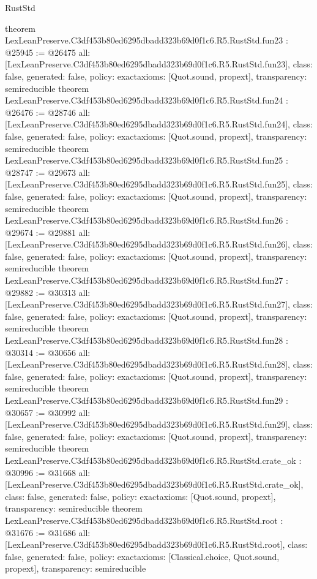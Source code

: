 \begin{lexlean}{RustStd}
\begin{coremodule}
{}
theorem LexLeanPreserve.C3df453b80ed6295dbadd323b69d0f1c6.R5.RustStd.fun23 : @25945 := @26475 {
  all: [LexLeanPreserve.C3df453b80ed6295dbadd323b69d0f1c6.R5.RustStd.fun23],
  class: false,
  generated: false,
  policy: exact{axioms: [Quot.sound, propext]},
  transparency: semireducible
}
theorem LexLeanPreserve.C3df453b80ed6295dbadd323b69d0f1c6.R5.RustStd.fun24 : @26476 := @28746 {
  all: [LexLeanPreserve.C3df453b80ed6295dbadd323b69d0f1c6.R5.RustStd.fun24],
  class: false,
  generated: false,
  policy: exact{axioms: [Quot.sound, propext]},
  transparency: semireducible
}
theorem LexLeanPreserve.C3df453b80ed6295dbadd323b69d0f1c6.R5.RustStd.fun25 : @28747 := @29673 {
  all: [LexLeanPreserve.C3df453b80ed6295dbadd323b69d0f1c6.R5.RustStd.fun25],
  class: false,
  generated: false,
  policy: exact{axioms: [Quot.sound, propext]},
  transparency: semireducible
}
theorem LexLeanPreserve.C3df453b80ed6295dbadd323b69d0f1c6.R5.RustStd.fun26 : @29674 := @29881 {
  all: [LexLeanPreserve.C3df453b80ed6295dbadd323b69d0f1c6.R5.RustStd.fun26],
  class: false,
  generated: false,
  policy: exact{axioms: [Quot.sound, propext]},
  transparency: semireducible
}
theorem LexLeanPreserve.C3df453b80ed6295dbadd323b69d0f1c6.R5.RustStd.fun27 : @29882 := @30313 {
  all: [LexLeanPreserve.C3df453b80ed6295dbadd323b69d0f1c6.R5.RustStd.fun27],
  class: false,
  generated: false,
  policy: exact{axioms: [Quot.sound, propext]},
  transparency: semireducible
}
theorem LexLeanPreserve.C3df453b80ed6295dbadd323b69d0f1c6.R5.RustStd.fun28 : @30314 := @30656 {
  all: [LexLeanPreserve.C3df453b80ed6295dbadd323b69d0f1c6.R5.RustStd.fun28],
  class: false,
  generated: false,
  policy: exact{axioms: [Quot.sound, propext]},
  transparency: semireducible
}
theorem LexLeanPreserve.C3df453b80ed6295dbadd323b69d0f1c6.R5.RustStd.fun29 : @30657 := @30992 {
  all: [LexLeanPreserve.C3df453b80ed6295dbadd323b69d0f1c6.R5.RustStd.fun29],
  class: false,
  generated: false,
  policy: exact{axioms: [Quot.sound, propext]},
  transparency: semireducible
}
theorem LexLeanPreserve.C3df453b80ed6295dbadd323b69d0f1c6.R5.RustStd.crate_ok : @30996 := @31668 {
  all: [LexLeanPreserve.C3df453b80ed6295dbadd323b69d0f1c6.R5.RustStd.crate_ok],
  class: false,
  generated: false,
  policy: exact{axioms: [Quot.sound, propext]},
  transparency: semireducible
}
theorem LexLeanPreserve.C3df453b80ed6295dbadd323b69d0f1c6.R5.RustStd.root : @31676 := @31686 {
  all: [LexLeanPreserve.C3df453b80ed6295dbadd323b69d0f1c6.R5.RustStd.root],
  class: false,
  generated: false,
  policy: exact{axioms: [Classical.choice, Quot.sound, propext]},
  transparency: semireducible
}


\end{coremodule}
\end{lexlean}
